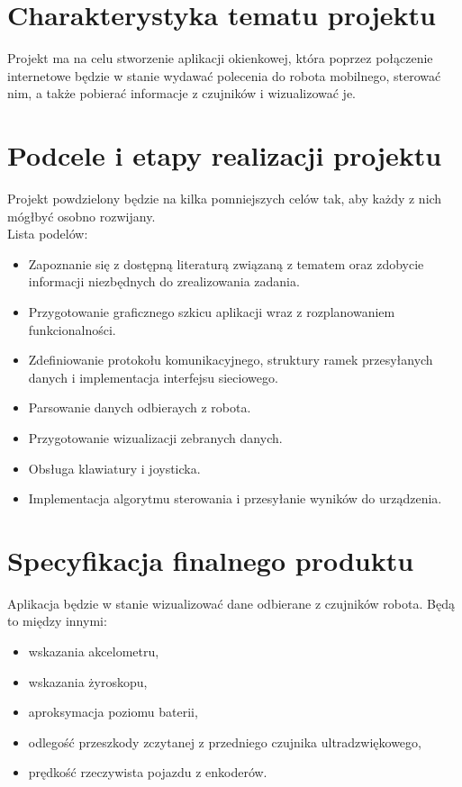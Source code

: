 \documentclass[12pt,a4paper,polish]{article}
\begin{document}
%
%
\pdfpageheight   297mm
\pdfpagewidth    210mm

\wdsStronaTytulowa
\wdsSpisTresci


 \section{Charakterystyka tematu projektu}
 \label{sekcja-charakterystyka}

  Projekt ma na celu stworzenie aplikacji okienkowej, która poprzez połączenie
  internetowe będzie w stanie wydawać polecenia do robota mobilnego, sterować nim,
  a także pobierać informacje z czujników i wizualizować je.

 \section{Podcele i etapy realizacji projektu}

  Projekt powdzielony będzie na kilka pomniejszych celów tak, aby każdy z nich
  mógłbyć osobno rozwijany. \\

  Lista podelów:
  \begin{itemize}
    \item Zapoznanie się z dostępną literaturą związaną z tematem oraz zdobycie 
    informacji niezbędnych do zrealizowania zadania.
    \item Przygotowanie graficznego szkicu aplikacji wraz z rozplanowaniem funkcionalności.
    \item Zdefiniowanie protokołu komunikacyjnego, struktury ramek przesyłanych danych
     i implementacja interfejsu sieciowego.
    \item Parsowanie danych odbieraych z robota.
    \item Przygotowanie wizualizacji zebranych danych.
    \item Obsługa klawiatury i joysticka.
    \item Implementacja algorytmu sterowania i przesyłanie wyników do urządzenia.
  \end{itemize}

 \section{Specyfikacja finalnego produktu}

  Aplikacja będzie w stanie wizualizować dane odbierane z czujników robota.
  Będą to między innymi:
  \begin{itemize}
    \item wskazania akcelometru,
    \item wskazania żyroskopu,
    \item aproksymacja poziomu baterii,
    \item odlegość przeszkody zczytanej z przedniego czujnika ultradzwiękowego,
    \item prędkość rzeczywista pojazdu z enkoderów.
  \end{itemize}
  
\end{document}
